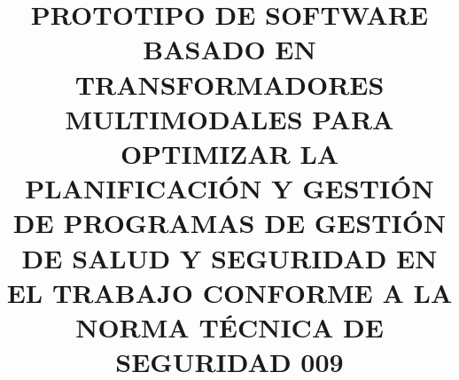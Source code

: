 \documentclass[12pt,a4paper,twoside]{report}
\begin{document}
	
	\title{PROTOTIPO DE SOFTWARE BASADO EN TRANSFORMADORES MULTIMODALES PARA OPTIMIZAR LA PLANIFICACIÓN Y GESTIÓN DE PROGRAMAS DE GESTIÓN DE SALUD Y SEGURIDAD EN EL TRABAJO CONFORME A LA NORMA TÉCNICA DE SEGURIDAD 009}
	
	\projectDay{\the\day}		%
	\projectMonth{\the\month} 	%
	\projectYear{\the\year}		%
	
	\supervisor{-----}
	
	
	\maketitle

	\pagestyle{empty}
	\setcounter{page}{2}
	
	
	
	\pagestyle{plain}
	\myChapterStyleB
	\mySectionStyleB
	
	
	
	\cleardoublepage
	
	\cleardoublepage
	
	\cleardoublepage

	
	\listoffigures
	\cleardoublepage

	
	\listoftables
	\cleardoublepage
	
	
	\cleardoublepage
	
	\tableofcontents
	\cleardoublepage
\end{document}
